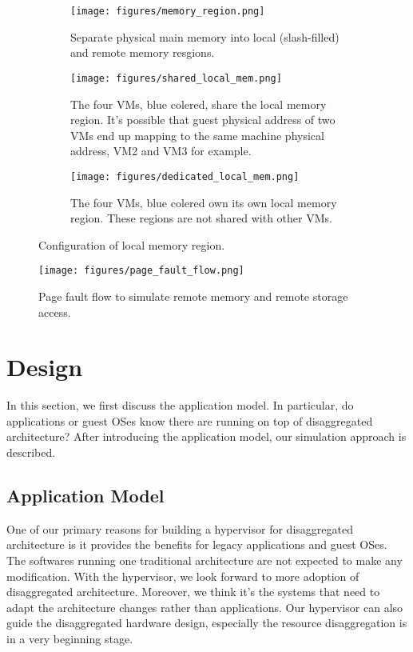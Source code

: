 \documentclass[twocolumn]{article}
\begin{document}
\begin{figure*}[h!]
     \centering
     \captionsetup[subfigure]{position=b}
     \begin{subfigure}[b]{\textwidth}
         \texttt{[image: figures/memory\_region.png]}
         \caption{Separate physical main memory into local (slash-filled) and remote memory resgions.}
         \label{fig:local memory regions}
     \end{subfigure}
     \hfill
     \begin{subfigure}[b]{\textwidth}
         \texttt{[image: figures/shared\_local\_mem.png]}
         \caption{The four VMs, blue colered, share the local memory region. It's possible that guest physical address of two VMs end up mapping to the same machine physical address, VM2 and VM3 for example.}
         \label{fig:shared local memory}
     \end{subfigure}
     \hfill
     \begin{subfigure}[b]{\textwidth}
         \texttt{[image: figures/dedicated\_local\_mem.png]}
         \caption{The four VMs, blue colered own its own local memory region. These regions are not shared with other VMs.}
         \label{fig:dedicated local memory}
     \end{subfigure}
     \caption{Configuration of local memory region.}
     \label{fig:local memory architecture}
\end{figure*}

\begin{figure*}[h!]
     \centering
     \texttt{[image: figures/page\_fault\_flow.png]}
     \caption{Page fault flow to simulate remote memory and remote storage access.}
     \label{fig:page fault flow}
\end{figure*}

\section{Design}
In this section, we first discuss the application model. In particular, do applications or guest OSes know there are running on top of disaggregated architecture? After introducing the application model, our simulation approach is described.

\subsection{Application Model}
One of our primary reasons for building a hypervisor for disaggregated architecture is it provides the benefits for legacy applications and guest OSes. The softwares running one traditional architecture are not expected to make any modification. With the hypervisor, we look forward to more adoption of disaggregated architecture. Moreover, we think it's the systems that need to adapt the architecture changes rather than applications. Our hypervisor can also guide the disaggregated hardware design, especially the resource disaggregation is in a very beginning stage.
\end{document}
